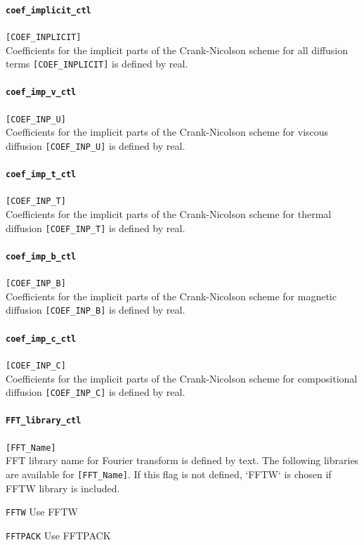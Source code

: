 \paragraph{\tt coef\_implicit\_ctl}
\label{href_t:coef_implicit_ctl}
\verb|[COEF_INPLICIT]| \\
Coefficients for the implicit parts of the Crank-Nicolson scheme for all diffusion terms  \verb|[COEF_INPLICIT]| is defined by real.

\paragraph{\tt coef\_imp\_v\_ctl}
\label{href_t:coef_imp_v_ctl}
\verb|[COEF_INP_U]| \\
Coefficients for the implicit parts of the Crank-Nicolson scheme for viscous diffusion \verb|[COEF_INP_U]| is defined by real.

\paragraph{\tt coef\_imp\_t\_ctl}
\label{href_t:coef_imp_t_ctl}
\verb|[COEF_INP_T]| \\
Coefficients for the implicit parts of the Crank-Nicolson scheme for thermal diffusion \verb|[COEF_INP_T]| is defined by real.

\paragraph{\tt coef\_imp\_b\_ctl}
\label{href_t:coef_imp_b_ctl}
\verb|[COEF_INP_B]| \\
Coefficients for the implicit parts of the Crank-Nicolson scheme for magnetic diffusion \verb|[COEF_INP_B]| is defined by real.

\paragraph{\tt coef\_imp\_c\_ctl}
\label{href_t:coef_imp_c_ctl}
\verb|[COEF_INP_C]| \\
Coefficients for the implicit parts of the Crank-Nicolson scheme for compositional diffusion \verb|[COEF_INP_C]| is defined by real. 


\paragraph{\tt FFT\_library\_ctl}
\label{href_t:FFT_library_ctl}
\verb|[FFT_Name]| \\
FFT library name for Fourier transform is defined by text. The following libraries are available for \verb|[FFT_Name]|. 
If this flag is not defined, `FFTW` is chosen if FFTW library is included.
%
\begin{description}
\item{\tt FFTW}		Use FFTW
\item{\tt FFTPACK}	Use FFTPACK
\end{description}
%

